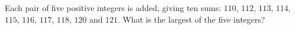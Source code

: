 Each pair of five positive integers is added, giving ten sums: $110$, $112$, $113$, $114$, $115$, $116$, $117$, $118$, $120$ and $121$. What is the largest of the five integers?
